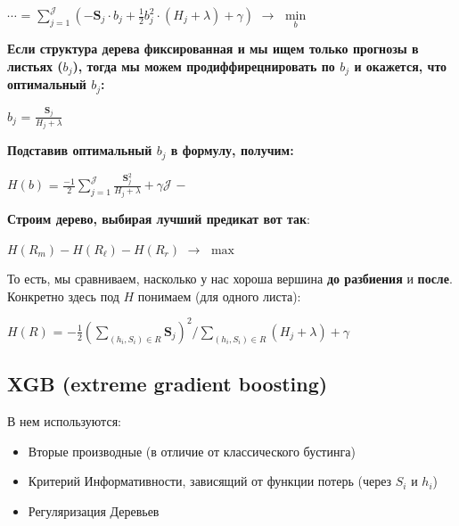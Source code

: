         \begin{center}
        \Large
            $\cdots$ = $\sum\limits_{j = 1}^\mathcal{J}(-\mathbf{S}_j\cdot b_j + \frac{1}{2}b_j^2\cdot(H_j + \lambda) + \gamma)$ $\longrightarrow$ $\min\limits_b$
        \end{center}
        \textbf{Если структура дерева фиксированная и мы ищем только прогнозы в листьях ($b_j$), тогда мы можем продиффирецнировать по $b_j$ и окажется, что оптимальный $b_j$: }
        \begin{center}
            \Large
            $b_j$ = $\frac{\mathbf{S}_j}{H_j + \lambda}$
        \end{center}

        \textbf{Подставив оптимальный $b_j$ в формулу, получим:}
        \begin{center}
        \Large
            $H(b)$ = $\frac{-1}{2} \sum\limits_{j = 1}^\mathcal{J}\frac{\mathbf{S}_j^2}{H_j + \lambda} + \gamma\mathcal{J}$ $-$ 
        \end{center}


        \textbf{Строим дерево, выбирая лучший предикат вот так}:
        \begin{center}
            $H(R_m) - H(R_\ell) - H(R_r)$ $\longrightarrow$ $\max$
        \end{center}
        То есть, мы сравниваем, насколько у нас хороша вершина \textbf{до разбиения} и \textbf{после}.\\

        Конкретно здесь под $H$ понимаем (для одного листа):
        \begin{center}
        \Large
            $H(R)$ = $-\frac{1}{2} (\sum\limits_{(h_i, S_i) \in R}\mathbf{S}_j)^2 / \sum\limits_{(h_i, S_i) \in R}(H_j + \lambda) + \gamma$
        \end{center}

    \subsection{XGB (extreme gradient boosting)}

        В нем используются:
        \begin{itemize}
            \item Вторые производные (в отличие от классического бустинга)

            \item Критерий Информативности, зависящий от функции потерь (через $S_i$ и $h_i $)

            \item Регуляризация Деревьев
        \end{itemize}



